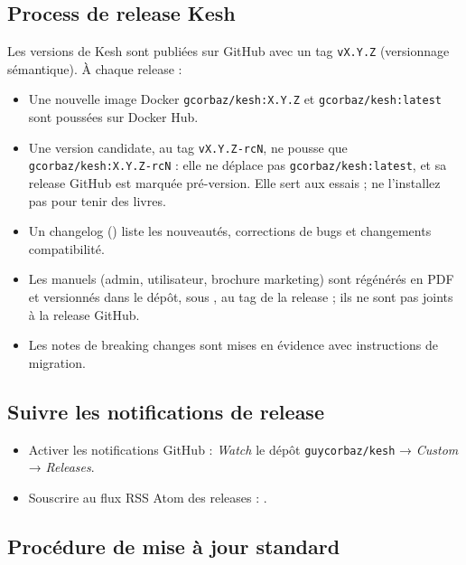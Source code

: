 \documentclass[a4paper,11pt,oneside]{article}
\begin{document}
\subsection{Process de release Kesh}

Les versions de Kesh sont publiées sur GitHub avec un tag \texttt{vX.Y.Z} (versionnage sémantique). À chaque release :

\begin{itemize}
    \item Une nouvelle image Docker \texttt{gcorbaz/kesh:X.Y.Z} et \texttt{gcorbaz/kesh:latest} sont poussées sur Docker Hub.
    \item Une version candidate, au tag \texttt{vX.Y.Z-rcN}, ne pousse que \texttt{gcorbaz/kesh:X.Y.Z-rcN} : elle ne déplace pas \texttt{gcorbaz/kesh:latest}, et sa release GitHub est marquée pré-version. Elle sert aux essais ; ne l'installez pas pour tenir des livres.
    \item Un changelog () liste les nouveautés, corrections de bugs et changements compatibilité.
    \item Les manuels (admin, utilisateur, brochure marketing) sont régénérés en PDF et versionnés dans le dépôt, sous , au tag de la release ; ils ne sont pas joints à la release GitHub.
    \item Les notes de breaking changes sont mises en évidence avec instructions de migration.
\end{itemize}

\subsection{Suivre les notifications de release}

\begin{itemize}
    \item Activer les notifications GitHub : \emph{Watch} le dépôt \texttt{guycorbaz/kesh} → \emph{Custom} → \emph{Releases}.
    \item Souscrire au flux RSS Atom des releases : .
\end{itemize}

\subsection{Procédure de mise à jour standard}
\end{document}

